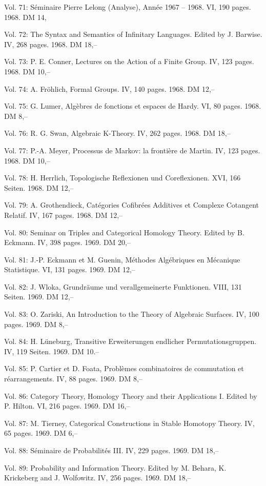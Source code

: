 Vol. 71: Séminaire Pierre Lelong (Analyse), Année 1967 -- 1968. VI, 190 pages. 1968. DM 14,

Vol. 72: The Syntax and Semantics of Infinitary Languages. Edited by J. Barwise. IV, 268 pages. 1968. DM 18,--

Vol. 73: P. E. Conner, Lectures on the Action of a Finite Group. IV, 123 pages. 1968. DM 10,--

Vol. 74: A. Fröhlich, Formal Groups. IV, 140 pages. 1968. DM 12,--

Vol. 75: G. Lumer, Algèbres de fonctions et espaces de Hardy. VI, 80 pages. 1968. DM 8,--

Vol. 76: R. G. Swan, Algebraic K-Theory. IV, 262 pages. 1968. DM 18,--

Vol. 77: P.-A. Meyer, Processus de Markov: la frontière de Martin. IV, 123 pages. 1968. DM 10,--

Vol. 78: H. Herrlich, Topologische Reflexionen und Coreflexionen. XVI, 166 Seiten. 1968. DM 12,--

Vol. 79: A. Grothendieck, Catégories Cofibrées Additives et Complexe Cotangent Relatif. IV, 167 pages. 1968. DM 12,--

Vol. 80: Seminar on Triples and Categorical Homology Theory. Edited by B. Eckmann. IV, 398 pages. 1969. DM 20,--

Vol. 81: J.-P. Eckmann et M. Guenin, Méthodes Algébriques en Mécanique Statistique. VI, 131 pages. 1969. DM 12,--

Vol. 82: J. Wloka, Grundräume und verallgemeinerte Funktionen. VIII, 131 Seiten. 1969. DM 12,--

Vol. 83: O. Zariski, An Introduction to the Theory of Algebraic Surfaces. IV, 100 pages. 1969. DM 8,--

Vol. 84: H. Lüneburg, Transitive Erweiterungen endlicher Permutationsgruppen. IV, 119 Seiten. 1969. DM 10.--

Vol. 85: P. Cartier et D. Foata, Problèmes combinatoires de commutation et réarrangements. IV, 88 pages. 1969. DM 8,--

Vol. 86: Category Theory, Homology Theory and their Applications I. Edited by P. Hilton. VI, 216 pages. 1969. DM 16,--

Vol. 87: M. Tierney, Categorical Constructions in Stable Homotopy Theory. IV, 65 pages. 1969. DM 6,--

Vol. 88: Séminaire de Probabilités III. IV, 229 pages. 1969. DM 18,--

Vol. 89: Probability and Information Theory. Edited by M. Behara, K. Krickeberg and J. Wolfowitz. IV, 256 pages. 1969. DM 18,--

